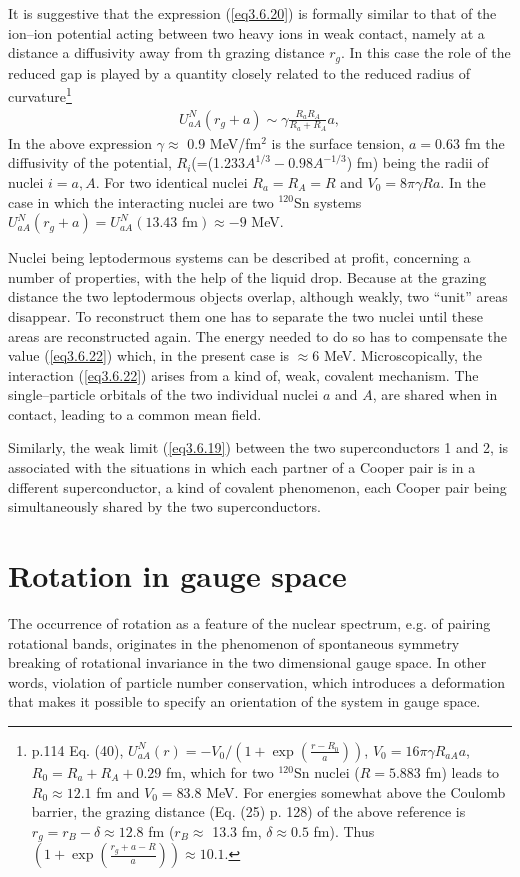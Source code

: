  
 It is suggestive that the expression (\ref{eq3.6.20}) is formally similar to that of the ion--ion potential acting between two heavy ions in weak contact, namely at a distance  a diffusivity away from th grazing distance $r_g$. In this case the role of the reduced gap is played by a quantity closely related to the reduced radius of curvature\footnote{\cite{Broglia:04a} p.114  Eq. (40), $U_{aA}^{N}(r)=-V_0/(1+\exp(\frac{r-R_0}{a}))$, $V_0=16\pi\gamma R_{aA}a$, $R_0=R_a+R_A+0.29$ fm, which for two $^{120}$Sn nuclei ($R=5.883$ fm) leads to $R_0\approx12.1$ fm and $V_0=83.8$ MeV. For energies somewhat above the Coulomb barrier, the grazing distance (Eq. (25) p. 128) of the above reference is $r_g=r_B-\delta\approx12.8$ fm ($r_B\approx$ 13.3 fm, $\delta\approx0.5$ fm). Thus $(1+\exp(\frac{r_g+a-R}{a}))\approx10.1$.}
 \begin{align}\label{eq3.6.22}
 U_{aA}^N(r_g+a)\sim \gamma\frac{R_aR_A}{R_a+R_A}a,
 \end{align}
 In the above expression $\gamma\approx$ 0.9 MeV/fm$^2$ is the surface tension, $a=0.63$ fm the diffusivity of the potential, $R_i$(=(1.233$A^{1/3}-0.98A^{-1/3}$) fm) being the radii of nuclei $i=a,A$. For two identical nuclei $R_a=R_A=R$ and $V_0=8\pi\gamma R a$. In the case in which the interacting nuclei are two  $^{120}$Sn systems  $U_{aA}^N(r_g+a)=U_{aA}^N(13.43 \text{ fm})\approx-9$ MeV.
 
 
 
  Nuclei being leptodermous systems can be described at profit, concerning a number of properties, with the help of the liquid drop. Because at the grazing distance the two leptodermous objects overlap, although weakly, two ``unit'' areas disappear. To reconstruct them one has to separate the two nuclei until these areas are reconstructed again. The energy needed to do so has to compensate the value (\ref{eq3.6.22}) which, in the present case  is $\approx$6 MeV. Microscopically, the interaction (\ref{eq3.6.22}) arises from a kind of, weak, covalent mechanism. The single--particle orbitals of the two individual nuclei $a$ and $A$, are shared when in contact, leading to a common mean field.
 
 
 Similarly, the weak limit (\ref{eq3.6.19}) between the two superconductors 1 and 2, is associated with the situations in which each partner of a Cooper pair is in a different superconductor, a kind of covalent phenomenon, each Cooper pair being simultaneously shared by the two superconductors.  
\section{Rotation in gauge space}\label{S3.7}
The occurrence of rotation as a feature of the nuclear spectrum, e.g. of pairing rotational bands, originates in the phenomenon of spontaneous symmetry breaking of rotational invariance in the two dimensional gauge space. In other words, violation of particle number conservation, which introduces a deformation that makes it possible to specify an orientation of the system in gauge space.


